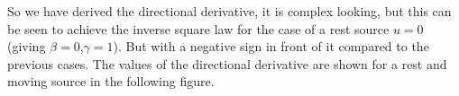







So we have derived the directional derivative, it is complex looking, but this can be seen to achieve the inverse square law for the case of a rest source $u=0$ (giving $\beta=0$,$\gamma=1$).
But with a negative sign in front of it compared to the previous cases.
The values of the directional derivative are shown for a rest and moving source in the following figure.


